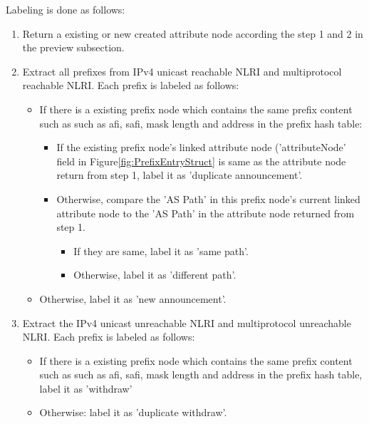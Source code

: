 Labeling is done as follows:
\begin{enumerate}
	\item{Return a existing or new created attribute node according the step 1 and 2 in the preview subsection. }
	\item{Extract all prefixes from IPv4 unicast reachable NLRI and multiprotocol reachable NLRI. Each prefix is labeled as follows: }
	\begin{itemize}
		\item{If there is a existing prefix node which contains the same prefix content such as such as afi, safi, mask length and address in the prefix hash table:}
		\begin{itemize}
			\item{If the existing prefix node's linked attribute node ('attributeNode' field in Figure\ref{fig:PrefixEntryStruct} is same as the attribute node return from step 1, label it as 'duplicate announcement'.}			\item{Otherwise, compare the 'AS Path' in this prefix node's current linked attribute node to the 'AS Path' in the attribute node returned from step 1. }
			\begin{itemize}
				\item{If they are same, label it as 'same path'. }				\item{Otherwise, label it as 'different path'. }
			\end{itemize} 	
		\end{itemize}			    
		\item{Otherwise, label it as 'new announcement'. }
	\end{itemize}
	
	\item{Extract the IPv4 unicast unreachable NLRI and multiprotocol unreachable NLRI. Each prefix is labeled as follows:}
	\begin{itemize}
		\item{If there is a existing prefix node which contains the same prefix content such as such as afi, safi, mask length and address in the prefix hash table, label it as 'withdraw'}		
			\item{Otherwise:  label it as 'duplicate withdraw'.}
	\end{itemize}
\end{enumerate}
	
